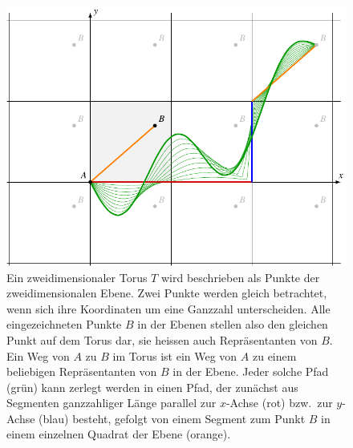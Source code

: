 %
%
%
\begin{figure}
\centering
\includegraphics{chapters/120-topologie/images/toruspfade.pdf}
\caption{Ein zweidimensionaler Torus $T$ wird beschrieben als 
Punkte der zweidimensionalen Ebene.
Zwei Punkte werden gleich betrachtet,
wenn sich ihre Koordinaten um eine Ganzzahl unterscheiden.
%
Alle eingezeichneten Punkte $B$ in der Ebenen stellen also den gleichen
Punkt auf dem Torus dar, sie heissen auch Repräsentanten von $B$.
Ein Weg von $A$ zu $B$ im Torus ist ein Weg von $A$ zu einem beliebigen
Repräsentanten von $B$ in der Ebene.
Jeder solche Pfad ({\color{darkgreen}grün}) kann zerlegt werden in
einen Pfad, der zunächst aus Segmenten ganzzahliger Länge parallel
zur $x$-Achse ({\color{darkred}rot}) bzw.~zur $y$-Achse
({\color{blue}blau}) besteht, gefolgt von einem Segment zum Punkt
$B$ in einem einzelnen Quadrat der Ebene ({\color{orange}orange}).
\label{buch:topologie:kohomologie:fig:toruspfade}}
\end{figure}

